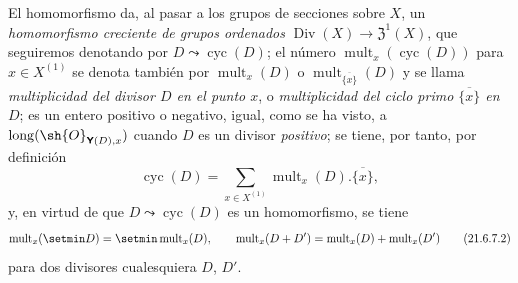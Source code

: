 \begin{env}[21.6.7]
\label{IV.21.6.7}
El homomorfismo  da, al pasar a los grupos de secciones sobre $X$, un \emph{homomorfismo creciente de grupos ordenados} $\operatorname{Div}(X)\to\mathfrak{Z}^1(X)$, que seguiremos denotando por $D\leadsto\operatorname{cyc}(D)$;
el número $\operatorname{mult}_x(\operatorname{cyc}(D))$ para $x\in X^{(1)}$ se denota también por $\operatorname{mult}_x(D)$ o $\operatorname{mult}_{\overline{\{x\}}}(D)$ y se llama \emph{multiplicidad del divisor $D$ en el punto $x$}, o \emph{multiplicidad del ciclo primo $\overline{\{x\}}$ en $D$};
es un entero positivo o negativo, igual, como se ha visto, a $\operatorname{long}(\sh{O}_{\boldsymbol{\mathsf{Y}}(D),x})$ cuando $D$ es un divisor \emph{positivo};
se tiene, por tanto, por definición
\[
\label{IV.21.6.7.1}
  \operatorname{cyc}(D)=\sum_{x\in X^{(1)}}\operatorname{mult}_x(D).\overline{\{x\}},
  \tag{21.6.7.1}
\]
y, en virtud de que $D\leadsto\operatorname{cyc}(D)$ es un homomorfismo, se tiene
\[
\label{IV.21.6.7.2}
  \operatorname{mult}_x(\setmin D)=\setmin\operatorname{mult}_x(D),\qquad
  \operatorname{mult}_x(D+D')=\operatorname{mult}_x(D)+\operatorname{mult}_x(D')
  \tag{21.6.7.2}
\]
para dos divisores cualesquiera $D$, $D'$.


\end{env}
